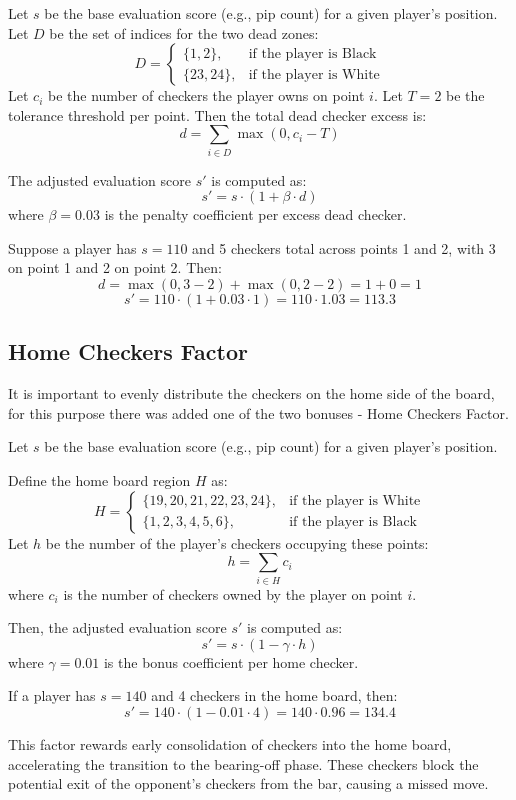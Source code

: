  Let $s$ be the base evaluation score (e.g., pip count) for a given player's position. Let $D$ be the set of indices for the two dead zones:
\[
D = 
\begin{cases}
\{1, 2\}, & \text{if the player is Black} \\
\{23, 24\}, & \text{if the player is White}
\end{cases}
\]
Let $c_i$ be the number of checkers the player owns on point $i$. Let $T = 2$ be the tolerance threshold per point. Then the total dead checker excess is:
\[
d = \sum_{i \in D} \max(0, c_i - T)
\]

The adjusted evaluation score $s'$ is computed as:
\[
s' = s \cdot (1 + \beta \cdot d)
\]
where $\beta = 0.03$ is the penalty coefficient per excess dead checker.

Suppose a player has $s = 110$ and 5 checkers total across points 1 and 2, with 3 on point 1 and 2 on point 2. Then:
\[
d = \max(0, 3 - 2) + \max(0, 2 - 2) = 1 + 0 = 1
\]
\[
s' = 110 \cdot (1 + 0.03 \cdot 1) = 110 \cdot 1.03 = 113.3
\]



\subsection*{Home Checkers Factor}
It is important to evenly distribute the checkers on the home side of the board, for this purpose there was added one of the two bonuses - Home Checkers Factor.

 Let $s$ be the base evaluation score (e.g., pip count) for a given player's position.

Define the home board region $H$ as:
\[
H = 
\begin{cases}
\{19, 20, 21, 22, 23, 24\}, & \text{if the player is White} \\
\{1, 2, 3, 4, 5, 6\}, & \text{if the player is Black}
\end{cases}
\]
Let $h$ be the number of the player's checkers occupying these points:
\[
h = \sum_{i \in H} c_i
\]
where $c_i$ is the number of checkers owned by the player on point $i$.

Then, the adjusted evaluation score $s'$ is computed as:
\[
s' = s \cdot (1 - \gamma \cdot h)
\]
where $\gamma = 0.01$ is the bonus coefficient per home checker.

If a player has $s = 140$ and 4 checkers in the home board, then:
\[
s' = 140 \cdot (1 - 0.01 \cdot 4) = 140 \cdot 0.96 = 134.4
\]

This factor rewards early consolidation of checkers into the home board, accelerating the transition to the bearing-off phase. These checkers block the potential exit of the opponent's checkers from the bar, causing a missed move.


